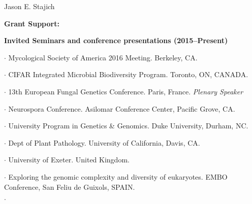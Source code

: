 \documentclass[10pt]{article}
\begin{document}
\begin{cv}{\centerline{Jason E. Stajich}}
\begin{cvlistcompact}{\bf Grant Support:}
\end{cvlistcompact}

\setlength{\cvlabelwidth}{8mm}
\begin{cvlistcompact}{\bf Invited Seminars and conference presentations (2015--Present)}
\item [2016] $\cdot$
  Mycological Society of America 2016 Meeting. Berkeley, CA. 
\item $\cdot$
    CIFAR Integrated Microbial Biodiversity Program. Toronto, ON, CANADA.
  \item $\cdot$   %
    13th European Fungal Genetics Conference.
    Paris, France.  {\it Plenary Speaker}
  \item $\cdot$ %
    Neurospora Conference. Asilomar Conference Center, Pacific
    Grove, CA.
  \item $\cdot$ %
    University Program in Genetics \& Genomics. Duke University, Durham, NC. 
  \item $\cdot$ %
    Dept of Plant Pathology. University of California, Davis,
    CA. 
  \item $\cdot$ %
    University of Exeter. United Kingdom.   
\item [2015] $\cdot$ %
  Exploring the genomic complexity and diversity of
  eukaryotes. EMBO Conference, San Feliu de Guixols, SPAIN. 
\item $\cdot$   %

\end{cvlistcompact}
\end{cv}
\end{document}
